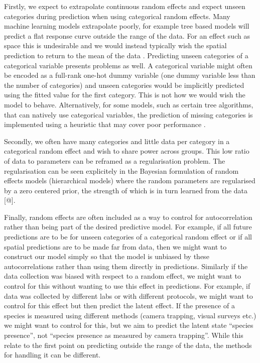 \documentclass[10pt,]{article}
\begin{document}
Firstly, we expect to extrapolate continuous random effects and expect unseen categories during prediction when using categorical random effects. Many machine learning models extrapolate poorly, for example tree based models will predict a flat response curve outside the range of the data. For an effect such as space this is undesirable and we would instead typically wish the spatial prediction to return to the mean of the data \citep{gpmean}. Predicting unseen categories of a categorical variable presents problems as well. A categorical variable might often be encoded as a full-rank one-hot dummy variable (one dummy variable less than the number of categories) and unseen categories would be implicitly predicted using the fitted value for the first category. This is not how we would wish the model to behave. Alternatively, for some models, such as certain tree algorithms, that can natively use categorical variables, the prediction of missing categories is implemented using a heuristic that may cover poor performance \citep{missingscats}.

Secondly, we often have many categories and little data per category in a categorical random effect and wish to share power across groups. This low ratio of data to parameters can be reframed as a regularisation problem. The regularisation can be seen explicitely in the Bayesian formulation of random effects models (hierarchical models) where the random parameters are regularised by a zero centered prior, the strength of which is in turn learned from the data {[}@{]}.

Finally, random effects are often included as a way to control for autocorrelation rather than being part of the desired predictive model. For example, if all future predictions are to be for unseen categories of a categorical random effect or if all spatial predictions are to be made far from data, then we might want to construct our model simply so that the model is unbiased by these autocorrelations rather than using them directly in predictions. Similarly if the data collection was biased with respect to a random effect, we might want to control for this without wanting to use this effect in predictions. For example, if data was collected by different labs or with different protocols, we might want to control for this effect but then predict the latent effect. If the presence of a species is measured using different methods (camera trapping, visual surveys etc.) we might want to control for this, but we aim to predict the latent state ``species presence'', not ``species presence as measured by camera trapping''. While this relate to the first point on predicting outside the range of the data, the methods for handling it can be different.
\end{document}
